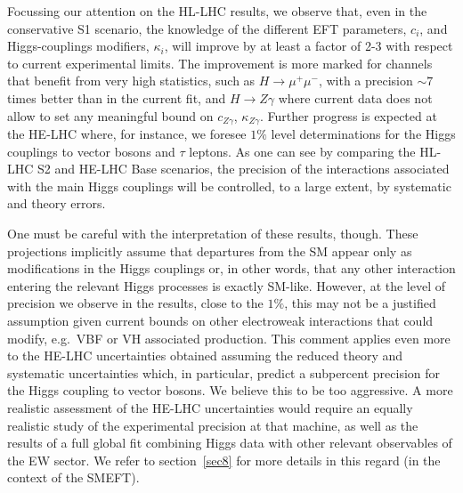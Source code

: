 Focussing our attention on the HL-LHC results, we observe that, even in the conservative S1 scenario, the knowledge of the different EFT parameters, $c_i$, and Higgs-couplings modifiers, $\kappa_i$, will improve by at least a factor of 2-3 with respect to current experimental limits. The improvement is more marked for channels that benefit from very high statistics, such as $H\to \mu^+ \mu^-$, with a precision $\sim 7$ times better than in the current fit,
and $H\to Z \gamma$ where current data does not allow to set
any meaningful bound on $c_{Z\gamma}$, $\kappa_{Z\gamma}$. Further progress is expected at the HE-LHC where, for instance, we foresee
$1\%$ level determinations for the Higgs couplings to vector bosons and $\tau$ leptons.
As one can see by comparing the HL-LHC S2 and HE-LHC Base scenarios, the precision of the interactions associated with the main Higgs couplings 
will be controlled, to a large extent, by systematic and theory errors. 

One must be careful with the interpretation of these results, though. These projections implicitly assume that departures from the SM appear only as modifications in the Higgs couplings or, in other words, that any other interaction entering the relevant Higgs processes is exactly SM-like. However, at the level of precision we observe in the results, close to the $1\%$, this may not be a justified assumption given current bounds on other electroweak interactions that could modify, e.g.~VBF or VH associated production. This comment applies even more to the HE-LHC uncertainties obtained assuming the reduced theory and systematic uncertainties which, in particular, predict a subpercent precision for the Higgs coupling to vector bosons. We believe this to be too aggressive. A more realistic assessment of the HE-LHC uncertainties would require an equally realistic study of the experimental precision at that machine, as well as the results of a full global fit combining Higgs data with other relevant observables of the EW sector. We refer to section~\ref{sec8} for more details in this regard (in the context of the SMEFT).

